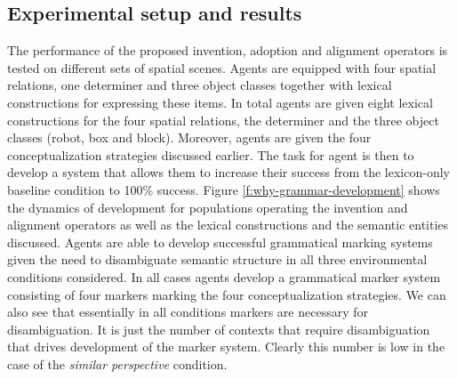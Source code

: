 \subsection{Experimental setup and results}
The performance of the proposed invention, adoption and 
alignment operators is tested on different sets of spatial scenes. Agents are equipped 
with four spatial relations, one determiner and three object classes together 
with lexical constructions for expressing these items. In total
agents are given eight lexical constructions for the four spatial relations, the 
determiner and the three object classes (robot, box and block). Moreover, 
agents are given the four conceptualization strategies discussed earlier. The task for agent is then to develop a system that allows them to increase their success 
from the lexicon-only baseline condition to 100\% success. Figure 
\ref{f:why-grammar-development} shows the dynamics of development for 
populations operating the invention and alignment operators as well as 
the lexical constructions and the semantic entities discussed. Agents are able 
to develop successful grammatical marking systems given the need 
to disambiguate semantic structure in all three environmental conditions considered. 
In all cases agents develop a grammatical marker system
consisting of four markers marking the four conceptualization strategies. 
We can also see that essentially in all conditions markers are necessary for disambiguation. It is just the number of contexts that require disambiguation 
that drives development of the marker system.
Clearly this number is low in the case of the \emph{similar perspective} condition.



